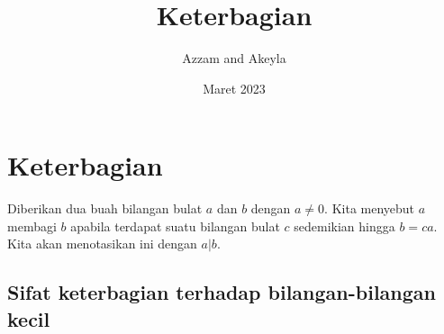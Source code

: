 \documentclass[11pt]{scrartcl}
\title{Keterbagian}
\author{Azzam and Akeyla}
\date{Maret 2023}
\begin{document}
\maketitle

\renewcommand*\contentsname{Daftar Isi}
\tableofcontents

\newpage
\section{Keterbagian}
Diberikan dua buah bilangan bulat $a$ dan $b$ dengan $a \neq 0$. Kita menyebut $a$ membagi $b$ apabila terdapat suatu bilangan bulat $c$ sedemikian hingga $b = ca$. Kita akan menotasikan ini dengan $a|b$.

\subsection{Sifat keterbagian terhadap bilangan-bilangan kecil}
\end{document}
